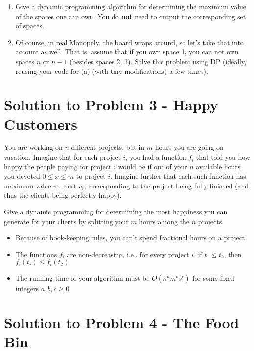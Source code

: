 \documentclass[11pt]{article}
\begin{document}
\begin{enumerate}[label=(\Alph*)]
\item Give a dynamic programming algorithm for determining the maximum value of the spaces one can own. You do \textbf{not} need to output the corresponding set of spaces.
\item Of course, in real Monopoly, the board wraps around, so let's take that into account as well. That is, assume that if you own space 1, you can not own spaces $n$ or $n - 1$ (besides spaces 2, 3). Solve this problem using DP (ideally, reusing your code for (a) (with tiny modifications) a few times).
\end{enumerate}

\pagebreak

\section*{Solution to Problem 3 - Happy Customers}

You are working on $n$ different projects, but in $m$ hours you are going on vacation. Imagine that for each project $i$, you had a function $f_i$ that told you how happy the people paying for project $i$ would be if out of your $n$ available hours you devoted $0 \leq x \leq m$ to project $i$. Imagine further that each such function has maximum value at most $s_i$, corresponding to the project being fully finished (and thus the clients being perfectly happy).

Give a dynamic programming for determining the most happiness you can generate for your clients by splitting your $m$ hours among the $n$ projects.

\begin{itemize}
\item Because of book-keeping rules, you can't spend fractional hours on a project.
\item The functions $f_i$ are non-decreasing, i.e., for every project $i$, if $t_1 \leq t_2$, then $f_i(t_i) \leq f_i(t_2)$
\item The running time of your algorithm must be $O(n^am^bs^c)$ for some fixed integers $a, b, c \geq 0$.
\end{itemize}

\pagebreak

\section*{Solution to Problem 4 - The Food Bin}
\end{document}
